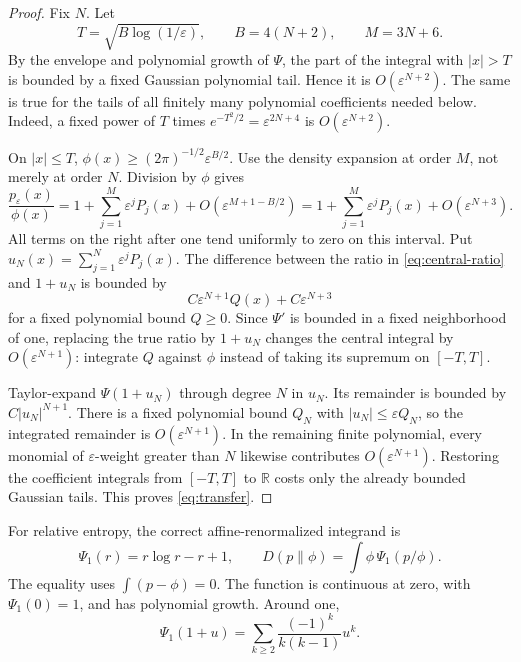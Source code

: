 \documentclass[11pt,a4paper]{article}
\numberwithin{equation}{section}
\theoremstyle{definition}
\theoremstyle{remark}
\newcommand{\R}{\mathbb R}
\newcommand{\eps}{\varepsilon}
\begin{document}
\begin{proof}
Fix $N$. Let
\begin{equation}
 T=\sqrt{B\log(1/\eps)},\qquad B=4(N+2),\qquad M=3N+6.
 \label{eq:cutoffs}
\end{equation}
By the envelope and polynomial growth of $\Psi$, the part of the integral
with $|x|>T$ is bounded by a fixed Gaussian polynomial tail. Hence it is
$O(\eps^{N+2})$. The same is true for the tails of all finitely many
polynomial coefficients needed below. Indeed, a fixed power of $T$ times
$e^{-T^2/2}=\eps^{2N+4}$ is $O(\eps^{N+2})$.

On $|x|\le T$, $\phi(x)\ge(2\pi)^{-1/2}\eps^{B/2}$.
Use the density expansion at order $M$, not merely at order $N$. Division by
$\phi$ gives
\begin{equation}
 \frac{p_\eps(x)}{\phi(x)}
 =1+\sum_{j=1}^{M}\eps^jP_j(x)+O(\eps^{M+1-B/2})
 =1+\sum_{j=1}^{M}\eps^jP_j(x)+O(\eps^{N+3}).
 \label{eq:central-ratio}
\end{equation}
All terms on the right after one tend uniformly to zero on this interval.
Put $u_N(x)=\sum_{j=1}^{N}\eps^jP_j(x)$. The difference between the
ratio in \eqref{eq:central-ratio} and $1+u_N$ is bounded by
\begin{equation}
 C\eps^{N+1}Q(x)+C\eps^{N+3}
 \label{eq:replace-error}
\end{equation}
for a fixed polynomial bound $Q\ge0$. Since $\Psi'$ is bounded in a fixed
neighborhood of one, replacing the true ratio by $1+u_N$ changes the central
integral by $O(\eps^{N+1})$: integrate $Q$ against $\phi$ instead of taking
its supremum on $[-T,T]$.

Taylor-expand $\Psi(1+u_N)$ through degree $N$ in $u_N$. Its remainder is
bounded by $C|u_N|^{N+1}$. There is a fixed polynomial bound $Q_N$ with
$|u_N|\le\eps Q_N$, so the integrated remainder is
$O(\eps^{N+1})$. In the remaining finite polynomial, every monomial of
$\eps$-weight greater than $N$ likewise contributes $O(\eps^{N+1})$.
Restoring the coefficient integrals from $[-T,T]$ to $\R$ costs only the
already bounded Gaussian tails. This proves \eqref{eq:transfer}.
\end{proof}

For relative entropy, the correct affine-renormalized integrand is
\begin{equation}
 \Psi_1(r)=r\log r-r+1,
 \qquad
 D(p\|\phi)=\int\phi\,\Psi_1(p/\phi).
 \label{eq:KL-psi}
\end{equation}
The equality uses $\int(p-\phi)=0$. The function is continuous at zero,
with $\Psi_1(0)=1$, and has polynomial growth. Around one,
\begin{equation}
 \Psi_1(1+u)=\sum_{k\ge2}\frac{(-1)^k}{k(k-1)}u^k.
 \label{eq:KL-series}
\end{equation}
\end{document}
